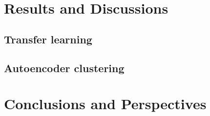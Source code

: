 \documentclass[preprint,12pt]{elsarticle}
\begin{document}
\section{Results and Discussions}\label{sec:results}

\subsection{Transfer learning}

\subsection{Autoencoder clustering}

\section{Conclusions and Perspectives}\label{sec:conclusion}

\appendix  



\begin{thebibliography}{00}


\bibitem{}

\end{thebibliography}
\end{document}
